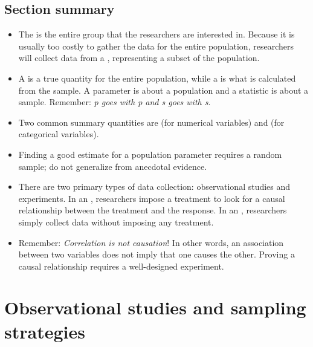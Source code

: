 \subsection*{Section summary}
\begin{itemize}
\item The  is the entire group that the researchers are interested in.  Because it is usually too costly to gather the data for the entire population, researchers will collect data from a , representing a subset of the population.

\item A  is a true quantity for the entire population, while a  is what is calculated from the sample.  A parameter is about a population and a statistic is about a sample.  Remember: \textit{p goes with p and s goes with s}.  

\item Two common summary quantities are  (for numerical variables) and  (for categorical variables).  

\item Finding a good estimate for a population parameter requires a random sample; do not generalize from anecdotal evidence.  

\item There are two primary types of data collection:  observational studies and experiments.  In an , researchers impose a treatment to look for a causal relationship between the treatment and the response.  In an , researchers simply collect data without imposing any treatment.

\item Remember:  \textit{Correlation is not causation}!  In other words, an association between two variables does not imply that one causes the other.  Proving a causal relationship requires a well-designed experiment.
  
\end{itemize}

{}




\section[Observational studies and sampling strategies]{Observational studies and sampling strategies}
\label{section_obs_data_sampling}

